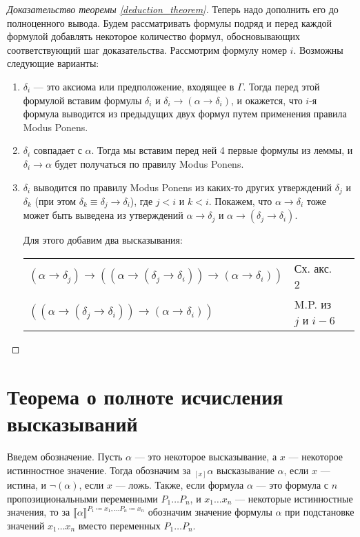 \begin{proof}[Доказательство теоремы \ref{deduction_theorem}]
Теперь надо дополнить его до полноценного вывода. Будем рассматривать
формулы подряд и перед каждой формулой добавлять некоторое количество
формул, обосновывающих соответствующий шаг доказательства. 
Рассмотрим формулу номер $i$. Возможны следующие варианты:

\begin{enumerate}
\item $\delta_i$ --- это аксиома или предположение, входящее в $\Gamma$. 
Тогда перед этой формулой вставим 
формулы $\delta_i$ и $\delta_i \rightarrow (\alpha \rightarrow \delta_i)$, 
и окажется, что $i$-я формула выводится из предыдущих двух формул
путем применения правила Modus Ponens.

\item $\delta_i$ совпадает с $\alpha$. Тогда мы вставим перед 
ней 4 первые формулы из леммы, и $\delta_i \rightarrow \alpha$ будет получаться
по правилу Modus Ponens.

\item $\delta_i$ выводится по правилу Modus Ponens из каких-то других
утверждений $\delta_j$ и $\delta_k$ (при этом 
$\delta_k \equiv \delta_j \rightarrow \delta_i$), где $j < i$ и $k < i$.
Покажем, что $\alpha \rightarrow \delta_i$ тоже может быть выведена
из утверждений $\alpha \rightarrow \delta_j$ и 
$\alpha \rightarrow (\delta_j \rightarrow \delta_i)$.

Для этого добавим два высказывания:

\begin{tabular}{lll}
$(\alpha \rightarrow \delta_j) \rightarrow ((\alpha \rightarrow (\delta_j \rightarrow \delta_i)) \rightarrow (\alpha \rightarrow \delta_i))$ & Сх. акс. 2\\
$((\alpha \rightarrow (\delta_j \rightarrow \delta_i)) \rightarrow (\alpha \rightarrow \delta_i))$ & M.P. из $j$ и $i-6$\\
\end{tabular}

\end{enumerate}
\end{proof}

\section{Теорема о полноте исчисления высказываний}

\begin{definition} 
Введем обозначение. Пусть $\alpha$ --- это некоторое высказывание, а $x$ --- некоторое
истинностное значение. Тогда обозначим за $_{[x]}\alpha$ высказывание
$\alpha$, если $x$ --- истина, и $\neg (\alpha)$, если $x$ --- ложь.
Также, если формула $\alpha$ --- это формула с $n$ пропозициональными переменными
$P_1 \dots P_n$, и $x_1 \dots x_n$ --- некоторые истинностные значения,
то за $\llbracket \alpha \rrbracket^{P_1 \coloneqq  x_1, \dots P_n \coloneqq  x_n}$ обозначим значение 
формулы $\alpha$ при подстановке значений $x_1 \dots x_n$ вместо переменных $P_1 \dots P_n$.
\end{definition}

